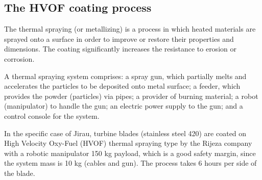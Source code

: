 \subsection{The HVOF coating process}\label{sec::desc_hvof}
The thermal spraying (or metallizing) is a process in which
heated materials are sprayed onto a surface in order to improve or
restore their properties and dimensions. The coating significantly increases the
resistance to erosion or corrosion.


A thermal spraying system comprises: a spray gun, which partially melts and
accelerates the particles to be deposited onto metal surface; a feeder, which
provides the powder (particles) via pipes; a provi\-der of burning material; a robot (manipulator) to handle the gun; an
electric power supply to the gun; and a control console for the system.

In the specific case of Jirau, turbine blades (stainless steel 420) %
are coated on High Velocity Oxy-Fuel (HVOF) thermal spraying type by the
Rijeza company with a robotic manipulator 150 kg payload, which is a good
safety margin, since the system mass is 10 kg (cables and gun). The process
takes 6 hours per side of the blade.

